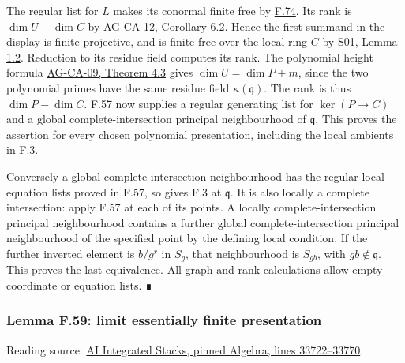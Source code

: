 \documentclass[11pt,a4paper,openany]{report}
\begin{document}
The regular list for \(L\) makes its conormal finite free by \hyperref[AG-RG-S05-algebra-lemma-regular-quasi-regular]{F.74}. Its rank is \(\dim U-\dim C\) by \href{https://github.com/KokunoYumeto/open-math-courses/blob/d02d0a3669f42579db037cd44de1d113fdd770a1/docs/courses/AG-CA/src/regular-sequences-depth-and-cohen-macaulay-modules.md}{AG-CA-12, Corollary 6.2}. Hence the first summand in the display is finite projective, and is finite free over the local ring \(C\) by \href{https://github.com/KokunoYumeto/open-math-courses/blob/main/docs/courses/AG-RG/AG-RG-S01.md}{S01, Lemma 1.2}. Reduction to its residue field computes its rank. The polynomial height formula \href{https://github.com/KokunoYumeto/open-math-courses/blob/d02d0a3669f42579db037cd44de1d113fdd770a1/docs/courses/AG-CA/src/krull-dimension-and-noether-normalization.md}{AG-CA-09, Theorem 4.3} gives \(\dim U=\dim P+m\), since the two polynomial primes have the same residue field \(\kappa(\mathfrak q)\). The rank is thus \(\dim P-\dim C\). F.57 now supplies a regular generating list for \(\ker(P\to C)\) and a global complete-intersection principal neighbourhood of \(\mathfrak q\). This proves the assertion for every chosen polynomial presentation, including the local ambients in F.3.

Conversely a global complete-intersection neighbourhood has the regular local equation lists proved in F.57, so gives F.3 at \(\mathfrak q\). It is also locally a complete intersection: apply F.57 at each of its points. A locally complete-intersection principal neighbourhood contains a further global complete-intersection principal neighbourhood of the specified point by the defining local condition. If the further inverted element is \(b/g^r\) in \(S_g\), that neighbourhood is \(S_{gb}\), with \(gb\notin\mathfrak q\). This proves the last equivalence. All graph and rank calculations allow empty coordinate or equation lists. ∎

\label{AG-RG-S05-algebra-lemma-limit-essentially-finite-presentation}

\subsubsection{Lemma F.59: limit essentially finite presentation}\label{AG-RG-S05-lemma-f.59-limit-essentially-finite-presentation}

Reading source: \href{https://github.com/KokunoYumeto/unofficial-stacks-project-ai-drafts/blob/565b10e987aba5969b21145a0833f42d69f96790/algebra.tex\#L33722-L33770}{AI Integrated Stacks, pinned Algebra, lines 33722--33770}.
\end{document}
